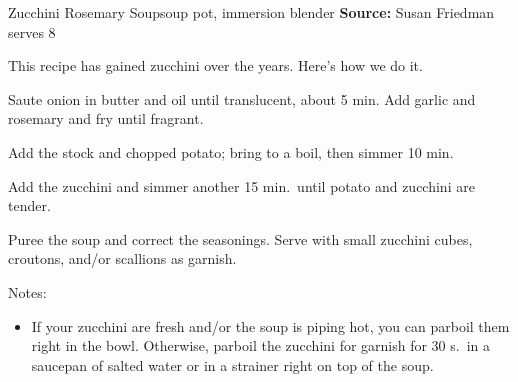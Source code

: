 \begin{recipe}{Zucchini Rosemary Soup}{soup pot, immersion blender \hfill }%
 {\textbf{Source:} Susan Friedman \hfill serves 8}

 \freeform This recipe has gained zucchini over the years. Here's how we do it.

 Saute onion in butter and oil until translucent, about 5 min. Add garlic and rosemary and fry until fragrant.

 Add the stock and chopped potato; bring to a boil, then simmer 10 min.

 Add the zucchini and simmer another 15 min.\ until potato and zucchini are tender.

 Puree the soup and correct the seasonings. Serve with small zucchini cubes, croutons, and/or scallions as garnish.

 \freeform Notes:
 \begin{itemize}
  \item If your zucchini are fresh and/or the soup is piping hot, you can parboil them right in the bowl. Otherwise, parboil the zucchini for garnish for 30 s.\ in a saucepan of salted water or in a strainer right on top of the soup.
 \end{itemize}
\end{recipe}
